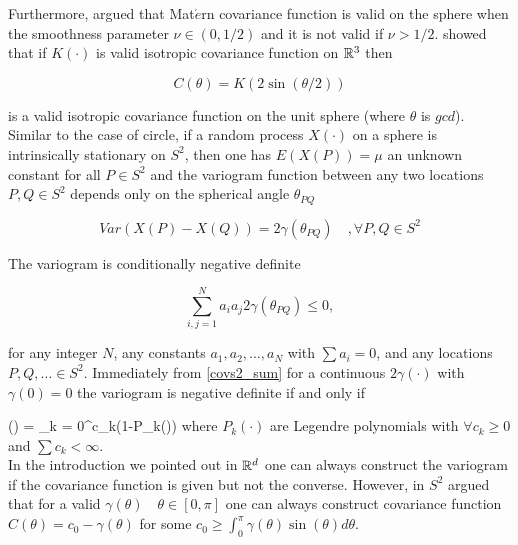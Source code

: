		Furthermore, \cite{Gneiting2013} argued that Mat$\acute{e}$rn covariance function is valid on the sphere when the smoothness parameter $\nu\in(0,1/2)$ and it is not valid if $\nu>1/2$. \cite{Yadrenko1983} showed that if $K(\cdot)$ is valid isotropic covariance function on $\mathbb{R}^3$ then
			
		\[
			C(\theta) = K(2\sin(\theta/2))
		\]
			
		is a valid isotropic covariance function on the unit sphere (where $\theta$ is $gcd$).\\
			
			
			
		Similar to the case of circle, if a random process $X(\cdot)$ on a sphere is intrinsically stationary on $S^2$, then one has $E(X(P))=\mu$ an unknown constant for all $P\in S^2$ and the variogram function between any two locations $P, Q \in S^2$ depends only on the spherical angle $\theta_{PQ}$ 
			
		\[
			Var(X(P)-X(Q)) = 2\gamma(\theta_{PQ}) \quad , \forall P, Q \in S^2
		\]
			
		The variogram is conditionally negative definite
			
		\[
			\sum_{i,j=1}^{N} a_i a_j 2\gamma(\theta_{PQ}) \le 0,
		\]
			
		for any integer $N$, any constants $a_1, a_2, \ldots, a_N$ with $\sum a_i = 0$, and any locations $P, Q, \ldots \in S^2$. Immediately from \ref{covs2_sum} for a continuous $2\gamma(\cdot)$ with $\gamma(0)=0$ the variogram is negative definite if and only if 
			
		\beq 
		\gamma(\theta) = \sum_{k = 0}^\infty c_k(1-P_k(\cos\theta))
		\eeq
		where $P_{k}(\cdot)$ are Legendre polynomials with $\forall c_k\ge 0$ and $\sum c_k < \infty$. \\
			
		In the introduction we pointed out in $\mathbb{R}^d$ one can always construct the variogram if the covariance function is given but not the converse. However, in $S^2$ \cite{Yaglom1961} argued that for a valid $\gamma(\theta) \quad \theta \in [0,\pi]$ one can always construct covariance function $C(\theta)=c_0-\gamma(\theta)$ for some $c_0 \ge \int_0^{\pi} \gamma(\theta)\sin(\theta)d\theta$. 
			
